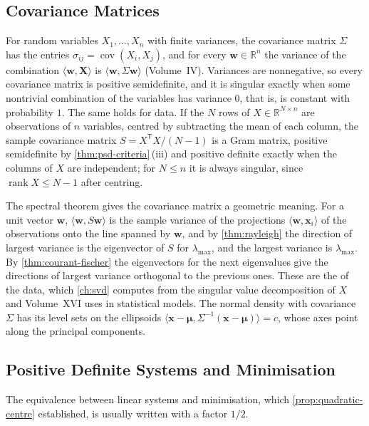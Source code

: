 \subsection{Covariance Matrices}

For random variables $X_1,\ldots,X_n$ with finite variances, the covariance matrix $\Sigma$ has the entries $\sigma_{ij}=\operatorname{cov}(X_i,X_j)$, and for every $\mathbf w\in\mathbb R^n$ the variance of the combination $\langle\mathbf w,\mathbf X\rangle$ is $\langle\mathbf w,\Sigma\mathbf w\rangle$ (Volume~IV). Variances are nonnegative, so every covariance matrix is positive semidefinite, and it is singular exactly when some nontrivial combination of the variables has variance $0$, that is, is constant with probability $1$. The same holds for data. If the $N$ rows of $X\in\mathbb R^{N\times n}$ are observations of $n$ variables, centred by subtracting the mean of each column, the sample covariance matrix $S=X^{\mathsf T}X/(N-1)$ is a Gram matrix, positive semidefinite by \cref{thm:psd-criteria}\,(iii) and positive definite exactly when the columns of $X$ are independent; for $N\le n$ it is always singular, since $\operatorname{rank}X\le N-1$ after centring.

The spectral theorem gives the covariance matrix a geometric meaning. For a unit vector $\mathbf w$, $\langle\mathbf w,S\mathbf w\rangle$ is the sample variance of the projections $\langle\mathbf w,\mathbf x_i\rangle$ of the observations onto the line spanned by $\mathbf w$, and by \cref{thm:rayleigh} the direction of largest variance is the eigenvector of $S$ for $\lambda_{\max}$, and the largest variance is $\lambda_{\max}$. By \cref{thm:courant-fischer} the eigenvectors for the next eigenvalues give the directions of largest variance orthogonal to the previous ones. These are the  of the data, which \cref{ch:svd} computes from the singular value decomposition of $X$ and Volume~XVI uses in statistical models. The normal density with covariance $\Sigma$ has its level sets on the ellipsoids $\langle\mathbf x-\boldsymbol\mu,\Sigma^{-1}(\mathbf x-\boldsymbol\mu)\rangle=c$, whose axes point along the principal components.

\subsection{Positive Definite Systems and Minimisation}

The equivalence between linear systems and minimisation, which \cref{prop:quadratic-centre} established, is usually written with a factor $1/2$.


